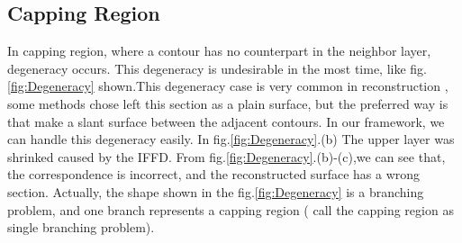 \documentclass[3p,times]{elsarticle}
\begin{document}
\subsection{Capping Region}
\label{capping region}
In capping region, where a contour  has no counterpart in the
neighbor layer, degeneracy occurs. This degeneracy is undesirable in
the most time, like fig.\ref{fig:Degeneracy} shown.This degeneracy case
is very common in reconstruction , some methods chose left this
section as a plain surface, but the preferred way is that make a slant
surface between the adjacent contours.  In our framework, we can
handle this degeneracy easily. In fig.\ref{fig:Degeneracy}.(b) The
upper layer was shrinked caused by the IFFD. From
fig.\ref{fig:Degeneracy}.(b)-(c),we can see that, the correspondence
is incorrect, and the reconstructed surface has a wrong
section. Actually, the shape shown in the fig.\ref{fig:Degeneracy} is a
branching problem, and one branch represents a capping region
(\cite{jeong_b-spline_1999} call the capping region as single
branching problem).
\end{document}
